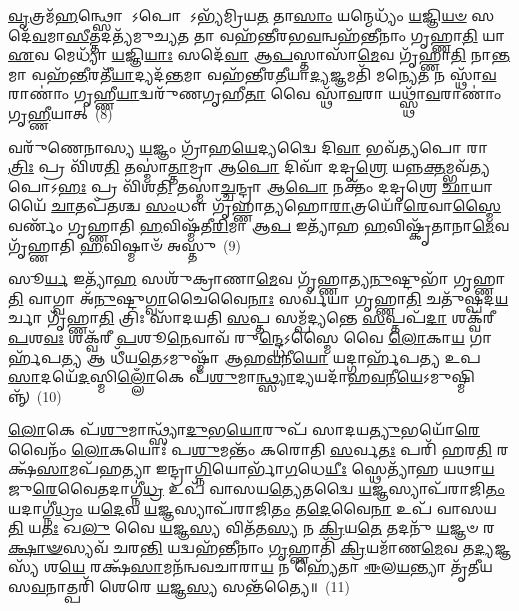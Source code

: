 \-\ul{𑌵𑍃}\-𑌤𑍍𑌰𑌮᳴\-\ul{𑌹}\-𑌨𑍍𑌥𑍍𑌸𑍋 \-𑌽𑌪𑍋 \-𑌽𑌭𑍍𑌯᳴𑌮𑍍𑌰𑌿𑌯\-\ul{𑌤} 𑌤𑌾\-\ul{𑌸𑌾𑌂} 𑌯𑌨𑍍𑌮𑍇𑌧𑍍𑌯𑌂᳴ \ul{𑌯}\-𑌜𑍍𑌞𑌿\-\ul{𑌯}\-\-\ul{𑍞} 𑌸𑌦𑍇᳴\-\ul{𑌵}\-𑌮𑌾\-\ul{𑌸𑍀}\-𑌤𑍍𑌤𑌦𑌤𑍍𑌯᳴𑌮𑍁𑌚𑍍𑌯\-\ul{𑌤} 𑌤𑌾 𑌵𑌹᳴𑌨𑍍𑌤𑍀𑌰𑌭\-\ul{𑌵}\-𑌨𑍍𑌵𑌹᳴𑌨𑍍𑌤𑍀𑌨𑌾𑌂 𑌗𑍃𑌹𑍍𑌣𑌾\-\ul{𑌤𑌿} 𑌯𑌾 \ul{𑌏}\-𑌵 𑌮𑍇𑌧𑍍𑌯𑌾᳴ \ul{𑌯}\-𑌜𑍍𑌞𑌿\-\ul{𑌯𑌾𑌃} 𑌸𑌦𑍇᳴\-\ul{𑌵𑌾} 𑌆\-\ul{𑌪}\-𑌸𑍍𑌤𑌾𑌸𑌾᳴\-\ul{𑌮𑍇}\-𑌵 𑌗𑍃᳴𑌹𑍍𑌣𑌾\-\ul{𑌤𑌿} 𑌨𑌾\-\ul{𑌨𑍍𑌤}\-𑌮𑌾 𑌵𑌹᳴\-\ul{𑌨𑍍𑌤𑍀}\-𑌰𑌤𑍀᳴\-\ul{𑌯𑌾}\-𑌦𑍍𑌯𑌦᳴\-\ul{𑌨𑍍𑌤}\-𑌮𑌾 𑌵𑌹᳴𑌨𑍍𑌤𑍀𑌰\-\ul{𑌤𑍀}\-𑌯𑌾\-\ul{𑌦𑍍𑌯}\-𑌜𑍍𑌞𑌮𑌤𑌿᳴ 𑌮𑌨𑍍𑌯𑍇\-\ul{𑌤} 𑌨 𑌸𑍍𑌥𑌾᳴\-\ul{𑌵}\-𑌰𑌾𑌣𑌾𑌂॑ 𑌗𑍃𑌹𑍍𑌣𑍀\-\ul{𑌯𑌾}\-𑌦𑍍𑌵𑌰𑍁᳴𑌣𑌗𑍃𑌹𑍀\-\ul{𑌤𑌾} 𑌵𑍈 𑌸𑍍𑌥𑌾᳴\-\ul{𑌵}\-𑌰𑌾 𑌯𑌥𑍍𑌸𑍍𑌥𑌾᳴\-\ul{𑌵}\-𑌰𑌾𑌣𑌾𑌂॑ 𑌗𑍃\-\ul{𑌹𑍍𑌣𑍀}\-𑌯𑌾𑌤𑍍~(8)

𑌵𑌰𑍁᳴𑌣𑍇𑌨𑌾𑌸𑍍𑌯 \ul{𑌯}\-𑌜𑍍𑌞𑌂 𑌗𑍍𑌰𑌾᳴𑌹\-\ul{𑌯𑍇}\-𑌦𑍍𑌯𑌦𑍍𑌵𑍈 𑌦𑌿\-\ul{𑌵𑌾} 𑌭𑌵᳴\-\ul{𑌤𑍍𑌯}\-𑌪𑍋 𑌰𑌾\-\ul{𑌤𑍍𑌰𑌿𑌃} 𑌪𑍍𑌰 𑌵𑌿᳴𑌶\-\ul{𑌤𑌿} 𑌤𑌸𑍍𑌮𑌾॑\-\ul{𑌤𑍍𑌤𑌾}\-𑌮𑍍𑌰𑌾 𑌆\-\ul{𑌪𑍋} 𑌦𑌿𑌵𑌾᳴ 𑌦𑌦𑍃\-\ul{𑌶𑍍𑌰𑍇} 𑌯𑌨𑍍𑌨\-\ul{𑌕𑍍𑌤}\-𑌮𑍍𑌭𑌵᳴\-\ul{𑌤𑍍𑌯}\-𑌪𑍋\-𑌽\-\ul{𑌹𑌃} 𑌪𑍍𑌰 𑌵𑌿᳴𑌶\-\ul{𑌤𑌿} 𑌤𑌸𑍍𑌮𑌾॑\-\ul{𑌚𑍍𑌚}\-𑌨𑍍𑌦𑍍𑌰𑌾 𑌆\-\ul{𑌪𑍋} 𑌨𑌕𑍍𑌤𑌂᳴ 𑌦𑌦𑍃𑌶𑍍𑌰𑍇 \ul{𑌛𑌾}\-𑌯𑌾𑌯𑍈᳴ \ul{𑌚𑌾}\-𑌤𑌪᳴𑌤𑌶𑍍𑌚 \ul{𑌸𑌂}\-𑌧𑍗 𑌗𑍃᳴𑌹𑍍𑌣𑌾𑌤𑍍𑌯𑌹𑍋\-\ul{𑌰𑌾}\-𑌤𑍍𑌰𑌯𑍋᳴\-\ul{𑌰𑍇}\-𑌵𑌾\-\ul{𑌸𑍍𑌮𑍈} 𑌵𑌰𑍍𑌣𑌂᳴ 𑌗𑍃𑌹𑍍𑌣𑌾𑌤𑌿 \ul{𑌹}\-𑌵𑌿𑌷𑍍𑌮᳴𑌤𑍀\-\ul{𑌰𑌿}\-𑌮𑌾 𑌆\-\ul{𑌪} 𑌇𑌤𑍍𑌯𑌾᳴𑌹 \ul{𑌹}\-𑌵𑌿𑌷𑍍𑌕𑍃᳴𑌤𑌾𑌨𑌾\-\ul{𑌮𑍇}\-𑌵 𑌗𑍃᳴𑌹𑍍𑌣𑌾𑌤𑌿 \ul{𑌹}\-𑌵𑌿𑌷𑍍𑌮𑌾𑍞᳴ 𑌅𑌸𑍍𑌤𑍁~(9)

𑌸𑍂\-\ul{𑌰𑍍𑌯} 𑌇𑌤𑍍𑌯𑌾᳴\-\ul{𑌹} 𑌸𑌶𑍁᳴𑌕𑍍𑌰𑌾𑌣𑌾\-\ul{𑌮𑍇}\-𑌵 𑌗𑍃᳴𑌹𑍍𑌣𑌾𑌤𑍍𑌯\-\ul{𑌨𑍁}\-𑌷𑍍𑌟𑍁𑌭𑌾᳴ 𑌗𑍃𑌹𑍍𑌣𑌾\-\ul{𑌤𑌿} 𑌵𑌾𑌗𑍍𑌵𑌾 𑌅᳴\-\ul{𑌨𑍁}\-𑌷𑍍𑌟𑍁\-\ul{𑌗𑍍𑌵𑌾}\-𑌚𑍈𑌵𑍈\-\ul{𑌨𑌾𑌃} 𑌸𑌰𑍍𑌵᳴𑌯𑌾 𑌗𑍃𑌹𑍍𑌣𑌾\-\ul{𑌤𑌿} 𑌚𑌤𑍁᳴𑌷𑍍𑌪𑌦\-\ul{𑌯}\-𑌰𑍍𑌚𑌾 𑌗𑍃᳴𑌹𑍍𑌣𑌾\-\ul{𑌤𑌿} 𑌤𑍍𑌰𑌿𑌃 𑌸𑌾᳴𑌦𑌯𑌤𑌿 \ul{𑌸}\-𑌪𑍍𑌤 𑌸𑌮𑍍𑌪᳴𑌦𑍍𑌯𑌨𑍍𑌤𑍇 \ul{𑌸}\-𑌪𑍍𑌤𑌪᳴\-\ul{𑌦𑌾} 𑌶𑌕𑍍𑌵᳴𑌰𑍀 \ul{𑌪}\-𑌶\-\ul{𑌵𑌃} 𑌶𑌕𑍍𑌵᳴𑌰𑍀 \ul{𑌪}\-𑌶𑍂\-\ul{𑌨𑍇}\-𑌵𑌾𑌵᳴ 𑌰𑍁\-\ul{𑌨𑍍𑌦𑍍𑌧𑍇}\-\-𑌽𑌸𑍍𑌮𑍈 𑌵𑍈 \ul{𑌲𑍋}\-𑌕𑌾\-\ul{𑌯} 𑌗𑌾𑌰𑍍\mbox{}𑌹᳴𑌪\-\ul{𑌤𑍍𑌯} 𑌆 𑌧𑍀᳴𑌯\-\ul{𑌤𑍇}\-\-𑌽𑌮𑍁𑌷𑍍𑌮𑌾᳴ 𑌆𑌹\-\ul{𑌵}\-𑌨𑍀\-\ul{𑌯𑍋} 𑌯𑌦𑍍𑌗𑌾𑌰𑍍\mbox{}𑌹᳴𑌪𑌤𑍍𑌯 𑌉𑌪\-\ul{𑌸𑌾}\-𑌦𑌯𑍇᳴\-\ul{𑌦}\-𑌸𑍍𑌮𑌿\-\ul{𑌲𑍍𑌲𑍋𑌁}\-𑌕𑍇 𑌪᳴\-\ul{𑌶𑍁}\-𑌮𑌾\-\ul{𑌨𑍍𑌥𑍍𑌸𑍍𑌯𑌾}\-𑌦𑍍𑌯𑌯𑌦𑌾᳴𑌹\-\ul{𑌵}\-𑌨𑍀\-\ul{𑌯𑍇}\-\-𑌽𑌮𑍁𑌷𑍍𑌮𑌿𑌨𑍍𑌨𑍍᳴~(10)

\-\ul{𑌲𑍋}\-𑌕𑍇 𑌪᳴\-\ul{𑌶𑍁}\-𑌮𑌾𑌨𑍍𑌥𑍍𑌸𑍍𑌯𑌾᳴\-\ul{𑌦𑍁}\-𑌭\-\ul{𑌯𑍋}\-𑌰𑍁𑌪᳴ 𑌸𑌾𑌦𑌯\-\ul{𑌤𑍍𑌯𑍁}\-𑌭𑌯𑍋᳴\-\ul{𑌰𑍇}\-𑌵𑍈𑌨𑌂᳴ \ul{𑌲𑍋}\-𑌕𑌯𑍋𑌃॑ 𑌪\-\ul{𑌶𑍁}\-𑌮𑌨𑍍𑌤𑌂᳴ 𑌕𑌰𑍋𑌤𑌿 \ul{𑌸}\-𑌰𑍍𑌵\-\ul{𑌤𑌃} 𑌪𑌰𑌿᳴ 𑌹𑌰\-\ul{𑌤𑌿} 𑌰𑌕𑍍𑌷᳴\-\ul{𑌸𑌾}\-𑌮𑌪᳴𑌹𑌤𑍍𑌯𑌾 𑌇𑌨𑍍𑌦𑍍𑌰𑌾\-\ul{𑌗𑍍𑌨𑌿}\-𑌯𑍋𑌰𑍍𑌭𑌾᳴\-\ul{𑌗}\-𑌧𑍇\-\ul{𑌯𑍀𑌃} 𑌸𑍍𑌥𑍇𑌤𑍍𑌯𑌾᳴𑌹 𑌯𑌥𑌾\-\ul{𑌯}\-𑌜𑍁\-\ul{𑌰𑍇}\-𑌵𑍈𑌤𑌦𑌾𑌗𑍍𑌨𑍀॑\-\ul{𑌧𑍍𑌰} 𑌉𑌪᳴ 𑌵𑌾𑌸𑌯\-\ul{𑌤𑍍𑌯𑍇}\-𑌤𑌦𑍍𑌵𑍈 \ul{𑌯}\-𑌜𑍍𑌞𑌸𑍍𑌯𑌾𑌪᳴𑌰𑌾𑌜𑌿\-\ul{𑌤𑌂} 𑌯𑌦𑌾𑌗𑍍𑌨𑍀॑\-\ul{𑌧𑍍𑌰𑌂} 𑌯\-\ul{𑌦𑍇}\-𑌵 \ul{𑌯}\-𑌜𑍍𑌞𑌸𑍍𑌯𑌾𑌪᳴𑌰𑌾𑌜𑌿\-\ul{𑌤𑌂} 𑌤\-\ul{𑌦𑍇}\-𑌵𑍈\-\ul{𑌨𑌾} 𑌉𑌪᳴ 𑌵𑌾𑌸𑌯\-\ul{𑌤𑌿} 𑌯\-\ul{𑌤𑌃} 𑌖\-\ul{𑌲𑍁} 𑌵𑍈 \ul{𑌯}\-𑌜𑍍𑌞\-\ul{𑌸𑍍𑌯} 𑌵𑌿𑌤᳴𑌤\-\ul{𑌸𑍍𑌯} 𑌨 \ul{𑌕𑍍𑌰𑌿}\-𑌯\-\ul{𑌤𑍇} 𑌤𑌦𑌨𑍁᳴ \ul{𑌯}\-𑌜𑍍𑌞𑍞 𑌰\-\ul{𑌕𑍍𑌷𑌾}\-\-\ul{𑍟}\-𑌸𑍍𑌯𑌵᳴ 𑌚𑌰\-\ul{𑌨𑍍𑌤𑌿} 𑌯𑌦𑍍𑌵𑌹᳴𑌨𑍍𑌤𑍀𑌨𑌾𑌂 \ul{𑌗𑍃}\-𑌹𑍍𑌣𑌾𑌤𑌿᳴ \ul{𑌕𑍍𑌰𑌿}\-𑌯𑌮𑌾᳴𑌣\-\ul{𑌮𑍇}\-𑌵 𑌤\-\ul{𑌦𑍍𑌯}\-𑌜𑍍𑌞𑌸𑍍𑌯᳴ 𑌶\-\ul{𑌯𑍇} 𑌰𑌕𑍍𑌷᳴\-\ul{𑌸𑌾}\-𑌮𑌨᳴𑌨𑍍𑌵𑌵𑌚𑌾𑌰𑌾\-\ul{𑌯} 𑌨 𑌹𑍍𑌯𑍇᳴𑌤𑌾 \ul{𑌈}\-𑌲\-\ul{𑌯}\-𑌨𑍍𑌤𑍍𑌯𑌾 𑌤𑍃᳴𑌤𑍀𑌯𑌸\-\ul{𑌵}\-𑌨𑌾𑌤𑍍𑌪𑌰𑌿᳴ 𑌶𑍇𑌰𑍇 \ul{𑌯}\-𑌜𑍍𑌞\-\ul{𑌸𑍍𑌯} 𑌸𑌨𑍍𑌤᳴𑌤𑍍𑌯𑍈॥~(11)

